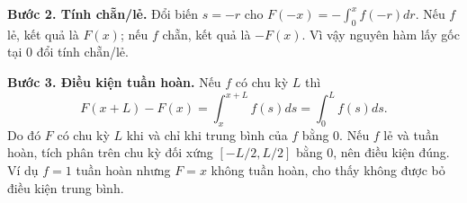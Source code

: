 \documentclass[10pt,a4paper]{article}
\begin{document}
\textbf{Bước 2. Tính chẵn/lẻ.} Đổi biến $s=-r$ cho $F(-x)=-\int_0^xf(-r)dr$. Nếu $f$ lẻ, kết quả là $F(x)$; nếu $f$ chẵn, kết quả là $-F(x)$. Vì vậy nguyên hàm lấy gốc tại $0$ đổi tính chẵn/lẻ.

\textbf{Bước 3. Điều kiện tuần hoàn.} Nếu $f$ có chu kỳ $L$ thì
\[F(x+L)-F(x)=\int_x^{x+L}f(s)ds=\int_0^Lf(s)ds.\]
Do đó $F$ có chu kỳ $L$ khi và chỉ khi trung bình của $f$ bằng $0$. Nếu $f$ lẻ và tuần hoàn, tích phân trên chu kỳ đối xứng $[-L/2,L/2]$ bằng $0$, nên điều kiện đúng. Ví dụ $f=1$ tuần hoàn nhưng $F=x$ không tuần hoàn, cho thấy không được bỏ điều kiện trung bình.
\end{document}
